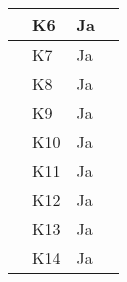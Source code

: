 \documentclass[class=article, crop=false]{standalone}
\begin{document}
\begin{table}[H]
\begin{tabularx}{\textwidth}{|l|l|l|X|}
            & K6       & Ja                 &                                                                                                                                                                                                    \\ \hline
            & K7       & Ja                 &                                                                                                                                                                                                    \\ \hline
            & K8       & Ja                 &                                                                                                                                                                                                    \\ \hline
            & K9       & Ja                 &                                                                                                                                                                                                    \\ \hline
            & K10      & Ja                 &                                                                                                                                                                                                    \\ \hline
            & K11      & Ja                 &                                                                                                                                                                                                    \\ \hline
            & K12      & Ja                 &                                                                                                                                                                                                    \\ \hline
            & K13      & Ja                 &                                                                                                                                                                                                    \\ \hline
            & K14      & Ja                 &                                                                                                                                                                                                    \\ \hline

\end{tabularx}
\end{table}
\end{document}
